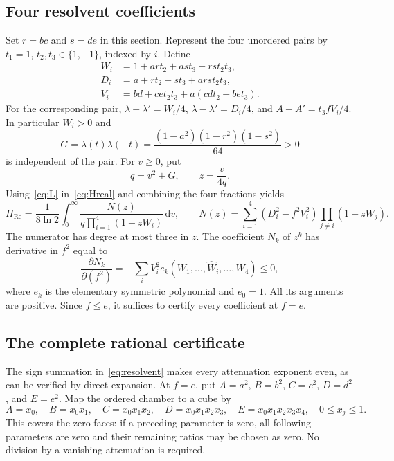 \documentclass[11pt,a4paper]{article}
\newcommand{\dd}{\mathrm{d}}
\newcommand{\Ree}{\operatorname{Re}}
\begin{document}
\subsection{Four resolvent coefficients}
Set $r=bc$ and $s=de$ in this section. Represent the four unordered
pairs by $t_1=1$, $t_2,t_3\in\{1,-1\}$, indexed by $i$. Define
\begin{align}
 W_i&=1+art_2+ast_3+rst_2t_3,\\
 D_i&=a+rt_2+st_3+arst_2t_3,\\
 V_i&=bd+cet_2t_3+a(cdt_2+bet_3).\label{eq:WDV}
\end{align}
For the corresponding pair,
$\lambda+\lambda'=W_i/4$,
$\lambda-\lambda'=D_i/4$, and
$A+A'=t_3 fV_i/4$. In particular $W_i>0$ and
\begin{equation}
 G=\lambda(t)\lambda(-t)
 =\frac{(1-a^2)(1-r^2)(1-s^2)}{64}>0
 \label{eq:G}
\end{equation}
is independent of the pair. For $v\ge0$, put
\begin{equation}
 q=v^2+G,\qquad z=\frac{v}{4q}.
\end{equation}
Using~\eqref{eq:L} in~\eqref{eq:Hreal} and combining the four
fractions yields
\begin{equation}
 H_{\Ree}=\frac1{8\ln2}\int_0^\infty
 \frac{N(z)}{q\prod_{i=1}^4(1+zW_i)}\,\dd v,\qquad
 N(z)=\sum_{i=1}^4(D_i^2-f^2V_i^2)
                \prod_{j\ne i}(1+zW_j).
 \label{eq:resolvent}
\end{equation}
The numerator has degree at most three in $z$.
The coefficient $N_k$ of $z^k$ has derivative in $f^2$ equal to
\begin{equation}
 \frac{\partial N_k}{\partial(f^2)}
 =-\sum_i V_i^2 e_k(W_1,\ldots,\widehat W_i,\ldots,W_4)\le0,
 \label{eq:monotone}
\end{equation}
where $e_k$ is the elementary symmetric polynomial and $e_0=1$.
All its arguments are positive. Since $f\le e$, it suffices to
certify every coefficient at $f=e$.

\subsection{The complete rational certificate}
The sign summation in~\eqref{eq:resolvent} makes every attenuation
exponent even, as can be verified by direct expansion.
At $f=e$, put $A=a^2$, $B=b^2$, $C=c^2$, $D=d^2$, and $E=e^2$.
Map the ordered chamber to a cube by
\begin{equation}
 A=x_0,\quad B=x_0x_1,\quad C=x_0x_1x_2,\quad
 D=x_0x_1x_2x_3,\quad E=x_0x_1x_2x_3x_4,
 \quad 0\le x_j\le1.\label{eq:ratios}
\end{equation}
This covers the zero faces: if a preceding parameter is zero, all
following parameters are zero and their remaining ratios may be
chosen as zero. No division by a vanishing attenuation is required.
\end{document}
